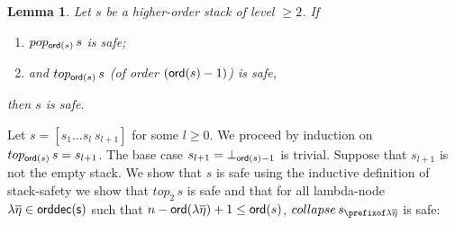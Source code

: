 \documentclass[a4paper]{article}
\newtheorem{lemma}{Lemma}[section]
\theoremstyle{remark}
\theoremstyle{definition}
\newcommand\orddec{\sf orddec}
\begin{document}
\begin{lemma}
\label{lem:cons_qsafety} Let $s$ be a higher-order stack of level $\geq 2$. If
\begin{enumerate}[1.]
\item $pop_{{\sf ord}(s)}\,s$ is safe;
\item and $top_{{\sf ord}(s)}\,s$ (of order $({\sf ord}(s)-1)$) is safe,
\end{enumerate}
then $s$ is safe.
\end{lemma}
\proof
Let $s = [s_1 \ldots s_l~s_{l+1}]$ for some $l\geq0$.
We proceed by induction on  $top_{{\sf ord}(s)}\,s=s_{l+1}$.
The base case $s_{l+1} = \bot_{{\sf ord}(s)-1}$ is trivial.
Suppose that $s_{l+1}$ is not the empty stack. We show that $s$ is safe using the inductive definition of stack-safety \ie we show that $top_2\,s$ is safe and that for all lambda-node $\lambda \overline{\eta} \in \orddec(s)$ such that $n-{\sf ord}(\lambda \overline{\eta})+1 \leq {\sf ord}(s)$, $collapse\,s_{\prefixof \lambda \overline{\eta}}$ is safe:
\end{document}

